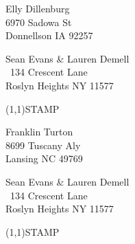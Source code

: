 \documentclass[12pt]{article}
\begin{document}
\begin{center} \begin{Huge} \vspace*{\fill}
Elly Dillenburg\\
6970 Sadowa St\\
Donnellson IA 92257\\
\vspace{\fill} \end{Huge} \end{center}

\clearpage

\begin{minipage}{.5\linewidth} \noindent
Sean Evans \& Lauren Demell\\\ 
134 Crescent Lane\\ 
Roslyn Heights NY 11577
\end{minipage}
\begin{minipage}{.5\linewidth \hspace{-.2in} \vspace{-.3in}}
\begin{flushright}
\framebox(1,1){STAMP}
\end{flushright}
\end{minipage}

\begin{center} \begin{Huge} \vspace*{\fill}
Franklin Turton\\
8699 Tuscany Aly\\
Lansing NC 49769\\
\vspace{\fill} \end{Huge} \end{center}

\clearpage

\begin{minipage}{.5\linewidth} \noindent
Sean Evans \& Lauren Demell\\\ 
134 Crescent Lane\\ 
Roslyn Heights NY 11577
\end{minipage}
\begin{minipage}{.5\linewidth \hspace{-.2in} \vspace{-.3in}}
\begin{flushright}
\framebox(1,1){STAMP}
\end{flushright}
\end{minipage}
\end{document}
